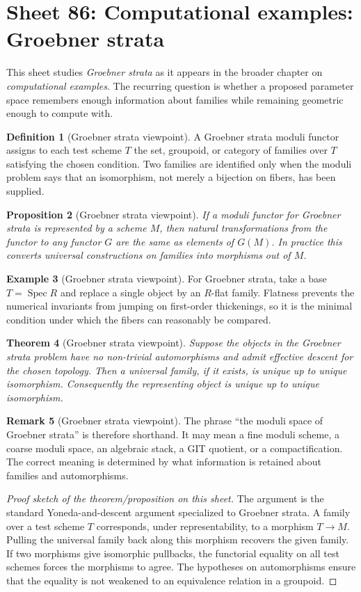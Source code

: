 \documentclass[11pt]{amsart}
\newtheorem{theorem}{Theorem}[section]
\newtheorem{proposition}[theorem]{Proposition}
\theoremstyle{definition}
\newtheorem{definition}[theorem]{Definition}
\newtheorem{example}[theorem]{Example}
\newtheorem{remark}[theorem]{Remark}
\newcommand{\Spec}{\operatorname{Spec}}
\begin{document}
\section{Sheet 86: Computational examples: Groebner strata}
This sheet studies \emph{Groebner strata} as it appears in the broader chapter on \emph{computational examples}.  The recurring question is whether a proposed parameter space remembers enough information about families while remaining geometric enough to compute with.
\begin{definition}[Groebner strata viewpoint]
A Groebner strata moduli functor assigns to each test scheme $T$ the set, groupoid, or category of families over $T$ satisfying the chosen condition.  Two families are identified only when the moduli problem says that an isomorphism, not merely a bijection on fibers, has been supplied.
\end{definition}
\begin{proposition}[Groebner strata viewpoint]
If a moduli functor for Groebner strata is represented by a scheme $M$, then natural transformations from the functor to any functor $G$ are the same as elements of $G(M)$.  In practice this converts universal constructions on families into morphisms out of $M$.
\end{proposition}
\begin{example}[Groebner strata viewpoint]
For Groebner strata, take a base $T=\Spec R$ and replace a single object by an $R$-flat family.  Flatness prevents the numerical invariants from jumping on first-order thickenings, so it is the minimal condition under which the fibers can reasonably be compared.
\end{example}
\begin{theorem}[Groebner strata viewpoint]
Suppose the objects in the Groebner strata problem have no non-trivial automorphisms and admit effective descent for the chosen topology.  Then a universal family, if it exists, is unique up to unique isomorphism.  Consequently the representing object is unique up to unique isomorphism.
\end{theorem}
\begin{remark}[Groebner strata viewpoint]
The phrase ``the moduli space of Groebner strata'' is therefore shorthand.  It may mean a fine moduli scheme, a coarse moduli space, an algebraic stack, a GIT quotient, or a compactification.  The correct meaning is determined by what information is retained about families and automorphisms.
\end{remark}
\begin{proof}[Proof sketch of the theorem/proposition on this sheet]
The argument is the standard Yoneda-and-descent argument specialized to Groebner strata.  A family over a test scheme $T$ corresponds, under representability, to a morphism $T\to M$.  Pulling the universal family back along this morphism recovers the given family.  If two morphisms give isomorphic pullbacks, the functorial equality on all test schemes forces the morphisms to agree.  The hypotheses on automorphisms ensure that the equality is not weakened to an equivalence relation in a groupoid.
\end{proof}
\end{document}
